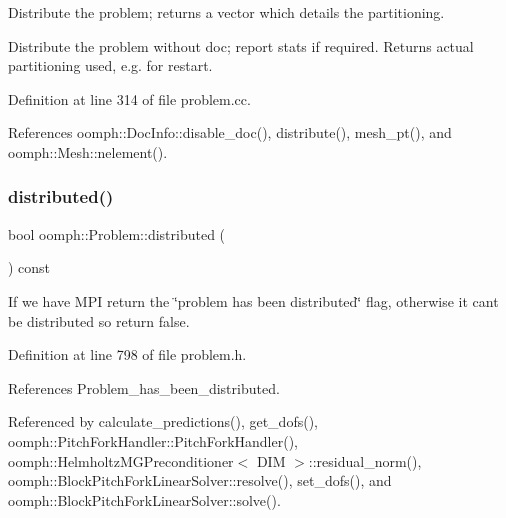 Distribute the problem; returns a vector which details the partitioning. 

Distribute the problem without doc; report stats if required. Returns actual partitioning used, e.\+g. for restart. 

Definition at line 314 of file problem.\+cc.



References oomph\+::\+Doc\+Info\+::disable\+\_\+doc(), distribute(), mesh\+\_\+pt(), and oomph\+::\+Mesh\+::nelement().

\mbox{\label{classoomph_1_1Problem_af5e9f1623cad361048856a4c0463ea23}} 
\subsubsection{\texorpdfstring{distributed()}{distributed()}}
{\footnotesize\ttfamily bool oomph\+::\+Problem\+::distributed (\begin{DoxyParamCaption}{ }\end{DoxyParamCaption}) const\hspace{0.3cm}{\ttfamily [inline]}}

If we have M\+PI return the \char`\"{}problem has been distributed\char`\"{} flag, otherwise it can\textquotesingle{}t be distributed so return false. 

Definition at line 798 of file problem.\+h.



References Problem\+\_\+has\+\_\+been\+\_\+distributed.



Referenced by calculate\+\_\+predictions(), get\+\_\+dofs(), oomph\+::\+Pitch\+Fork\+Handler\+::\+Pitch\+Fork\+Handler(), oomph\+::\+Helmholtz\+M\+G\+Preconditioner$<$ D\+I\+M $>$\+::residual\+\_\+norm(), oomph\+::\+Block\+Pitch\+Fork\+Linear\+Solver\+::resolve(), set\+\_\+dofs(), and oomph\+::\+Block\+Pitch\+Fork\+Linear\+Solver\+::solve().

\mbox{\label{classoomph_1_1Problem_a4d329a86be53aee9f96a3428809db5f0}} 

